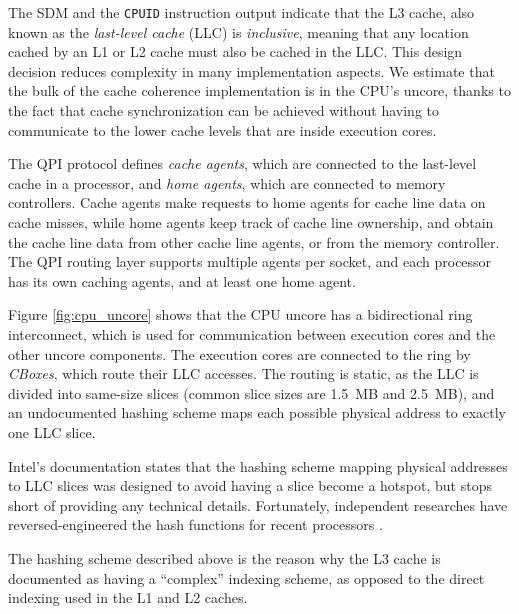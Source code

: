 The SDM and the \texttt{CPUID} instruction output indicate that the L3 cache,
also known as the \textit{last-level cache} (LLC) is \textit{inclusive},
meaning that any location cached by an L1 or L2 cache must also be cached in
the LLC. This design decision reduces complexity in many implementation
aspects. We estimate that the bulk of the cache coherence implementation is in
the CPU's uncore, thanks to the fact that cache synchronization can be achieved
without having to communicate to the lower cache levels that are inside
execution cores.

The QPI protocol defines \textit{cache agents}, which are connected to the
last-level cache in a processor, and \textit{home agents}, which are connected
to memory controllers. Cache agents make requests to home agents for cache line
data on cache misses, while home agents keep track of cache line ownership, and
obtain the cache line data from other cache line agents, or from the memory
controller. The QPI routing layer supports multiple agents per socket, and each
processor has its own caching agents, and at least one home agent.


Figure \ref{fig:cpu_uncore} shows that the CPU uncore has a bidirectional ring
interconnect, which is used for communication between execution cores and the
other uncore components. The execution cores are connected to the ring by
\textit{CBoxes}, which route their LLC accesses. The routing is static, as the
LLC is divided into same-size slices (common slice sizes are 1.5~MB and
2.5~MB), and an undocumented hashing scheme maps each possible physical address
to exactly one LLC slice.

Intel's documentation states that the hashing scheme mapping physical addresses
to LLC slices was designed to avoid having a slice become a hotspot, but stops
short of providing any technical details. Fortunately, independent researches
have reversed-engineered the hash functions for recent processors
\cite{inci2015rsachannel, maurice2015intelhash, yarom2015intelhash}.

The hashing scheme described above is the reason why the L3 cache is documented
as having a ``complex'' indexing scheme, as opposed to the direct indexing used
in the L1 and L2 caches.


